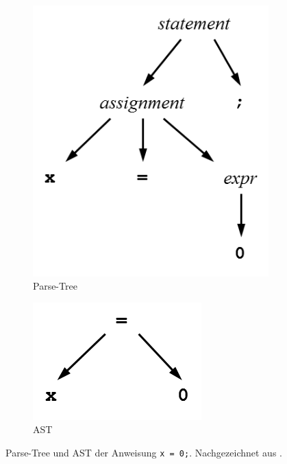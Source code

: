\begin{figure}[H]
        \begin{subfigure}[b]{0.45\textwidth}
        	\centering
            \includegraphics[width=\textwidth]{images/kapitel4/parseTreeGraph.png}
            \caption{Parse-Tree}
            \label{fig:bsp_disp_l}
        \end{subfigure}
        \begin{subfigure}[b]{0.30\textwidth}
            \centering
            \includegraphics[width=\textwidth]{images/kapitel4/astGraph.png}
            \caption{AST}
            \label{fig:bsp_disp_r}
        \end{subfigure}
        \caption{Parse-Tree und AST der Anweisung \texttt{x = 0;}. Nachgezeichnet aus \cite{book:parrLang}.}
	    \label{fig:Beispiel_Disparitätsbild}
\end{figure}

